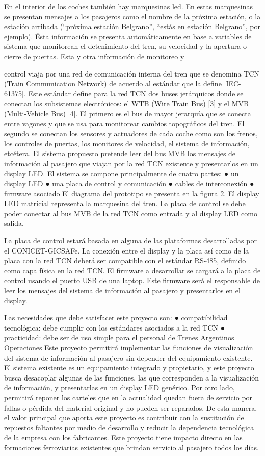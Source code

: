 En el interior de los coches también hay marquesinas led. En estas marquesinas se presentan
mensajes a los pasajeros como el nombre de la próxima estación, o la estación arribada
(“próxima estación Belgrano”, “estás en estación Belgrano”, por ejemplo). Ésta información se
presenta automáticamente en base a variables de sistema que monitorean el detenimiento del
tren, su velocidad y la apertura o cierre de puertas. Esta y otra información de monitoreo y

control viaja por una red de comunicación interna del tren que se denomina TCN (Train
Communication Network) de acuerdo al estándar que la define [IEC-61375]. Este estándar define
para la red TCN dos buses jerárquicos donde se conectan los subsistemas electrónicos: el WTB
(Wire Train Bus) [3] y el MVB (Multi-Vehicle Bus) [4]. El primero es el bus de mayor jerarquía que
se conecta entre vagones y que se usa para monitorear cambios topográficos del tren. El
segundo se conectan los sensores y actuadores de cada coche como son los frenos, los
controles de puertas, los monitores de velocidad, el sistema de información, etcétera.
El sistema propuesto pretende leer del bus MVB los mensajes de información al pasajero que
viajan por la red TCN existente y presentarlos en un display LED. El sistema se compone
principalmente de cuatro partes:
● un display LED
● una placa de control y comunicación
● cables de interconexión
● firmware asociado
El diagrama del prototipo se presenta en la figura 2. El display LED matricial representa la
marquesina del tren. La placa de control se debe poder conectar al bus MVB de la red TCN
como entrada y al display LED como salida.


La placa de control estará basada en alguna de las plataformas desarrolladas por el
CONICET-GICSAFe. La conexión entre el display y la placa así como de la placa con la red TCN
deberá ser compatible con el estándar RS-485, definido como capa física en la red TCN. El
firmware a desarrollar se cargará a la placa de control usando el puerto USB de una laptop. Este
firmware será el responsable de leer los mensajes del sistema de información al pasajero y
presentarlos en el display.


Las necesidades que debe satisfacer este proyecto son:
● compatibilidad tecnológica: debe cumplir con los estándares asociados a la red TCN
● practicidad: debe ser de uso simple para el personal de Trenes Argentinos Operaciones
Este proyecto permitirá implementar las funciones de visualización del sistema de información al
pasajero sin depender del equipamiento existente. El sistema existente es un equipamiento
integrado y propietario, y este proyecto busca desacoplar algunas de las funciones, las que
corresponden a la visualización de información, y presentarlas en un display LED genérico. Por
otro lado, permitirá reponer los carteles que en la actualidad quedan fuera de servicio por fallas o
pérdida del material original y no pueden ser reparados. De esta manera, el valor principal que
aporta este proyecto es contribuir con la sustitución de repuestos faltantes por medio de
desarrollo y reducir la dependencia tecnológica de la empresa con los fabricantes. Este proyecto
tiene impacto directo en las formaciones ferroviarias existentes que brindan servicio al pasajero
todos los días.


